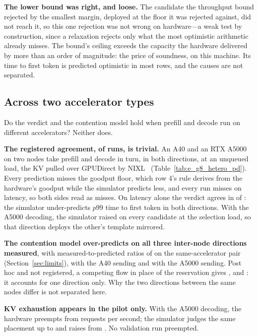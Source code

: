 \textbf{The lower bound was right, and loose.} The candidate the throughput
bound rejected by the smallest margin, deployed at the floor it was rejected
against, did not reach it, so this one rejection was not wrong on hardware---a
weak test by construction, since a relaxation rejects only what the most
optimistic arithmetic already misses. The bound's ceiling exceeds the capacity
the hardware delivered by more than an order of magnitude: the price of
soundness, on this machine. Its time to first token is predicted optimistic in
most rows, and the causes are not separated.


\subsection{Across two accelerator types}
\label{sec:eval-pd}

Do the verdict and the contention model hold when prefill and decode run on
different accelerators? Neither does.



\textbf{The registered agreement, \egeightAgree{} of \egeightRuns{} runs, is
trivial.} An A40 and an RTX A5000 on two nodes take prefill and decode in turn,
in both directions, at an unqueued load, the KV pulled over GPUDirect by
NIXL~\cite{nixl} (Table~\ref{tab:e_g8_hetero_pd}). Every prediction misses the
goodput floor, which row 4's rule derives from the hardware's goodput while the
simulator predicts less, and every run misses on latency, so both sides read
as misses. On latency alone the verdict agrees in \egeightLatAgree{} of
\egeightRuns{}: the simulator under-predicts $p99$ time to first token in both
directions. With the A5000 decoding, the simulator raised on every candidate at
the selection load, so that direction deploys the other's template mirrored.

\textbf{The contention model over-predicts on all three inter-node directions
measured}, with measured-to-predicted ratios of \egeightGfiveRatio{} on the
same-accelerator pair (Section~\ref{sec:limits}), \egeightDoneRatio{} with the
A40 sending and \egeightDtwoRatio{} with the A5000 sending. Post hoc and not
registered, a competing flow in place of the reservation gives
\egeightPsGfive{}, \egeightPsDone{} and \egeightPsDtwo{}: it accounts for one
direction only. Why the two directions between the same nodes differ is not
separated here.

\textbf{KV exhaustion appears in the pilot only.} With the A5000 decoding, the
hardware preempts from \egeightOnset{} requests per second; the simulator
judges the same placement up to \egeightCeiling{} and raises from
\egeightRaises{}. No validation run preempted.
